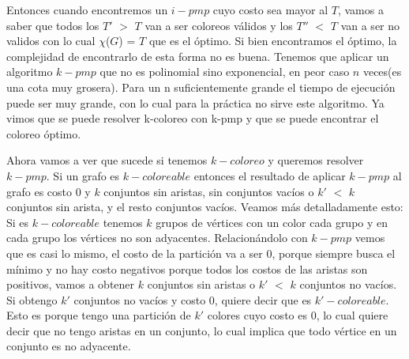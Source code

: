 \documentclass[a4paper]{article}
\begin{document}
Entonces cuando encontremos un $i-pmp$ cuyo costo sea mayor al $T$, vamos a saber que todos los $T'$ $>$ $T$ van a ser coloreos válidos y los $T''$ $<$ $T$ van a ser no validos con lo cual $\chi$($G$) = $T$ que es el óptimo.\newline
Si bien encontramos el óptimo, la complejidad de encontrarlo de esta forma no es buena. Tenemos que aplicar un algoritmo $k-pmp$ que no es polinomial sino exponencial, en peor caso $n$ veces(es una cota muy grosera). Para un n suficientemente grande el tiempo de ejecución puede ser muy grande, con lo cual para la práctica no sirve este algoritmo.\newline
Ya vimos que se puede resolver k-coloreo con k-pmp y que se puede encontrar el coloreo óptimo.\newline

Ahora vamos a ver que sucede si tenemos $k-coloreo$ y queremos resolver $k-pmp$.\newline
Si un grafo es $k-coloreable$ entonces el resultado de aplicar $k-pmp$ al grafo es costo 0 y $k$ conjuntos sin aristas, sin conjuntos vacíos o $k'$ $<$ $k$ conjuntos sin arista, y el resto conjuntos vacíos. Veamos más detalladamente esto:\newline
Si es $k-coloreable$ tenemos $k$ grupos de vértices con un color cada grupo y en cada grupo los vértices no son adyacentes. Relacionándolo con $k-pmp$ vemos que es casi lo mismo, el costo de la partición va a ser 0, porque siempre busca el mínimo y no hay costo negativos porque todos los costos de las aristas son positivos, vamos a obtener $k$ conjuntos sin aristas o $k'$ $<$ $k$ conjuntos no vacíos.\newline
Si obtengo $k'$ conjuntos no vacíos y costo 0, quiere decir que es $k'-coloreable$. Esto es porque tengo una partición de $k'$ colores cuyo costo es 0, lo cual quiere decir que no tengo aristas en un conjunto, lo cual implica que todo vértice en un conjunto es no adyacente.\newline
\end{document}
